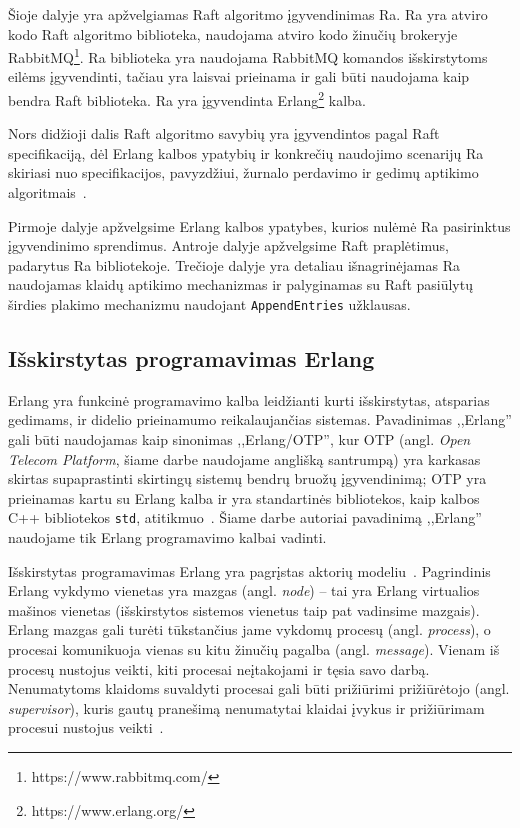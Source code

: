 \documentclass{VUMIFPSkursinis}
\begin{document}
Šioje dalyje yra apžvelgiamas Raft algoritmo įgyvendinimas Ra. Ra yra atviro kodo Raft algoritmo biblioteka, naudojama atviro kodo žinučių brokeryje RabbitMQ\footnote{https://www.rabbitmq.com/}. Ra biblioteka yra naudojama RabbitMQ komandos išskirstytoms eilėms įgyvendinti, tačiau yra laisvai prieinama ir gali būti naudojama kaip bendra Raft biblioteka. Ra yra įgyvendinta Erlang\footnote{https://www.erlang.org/} kalba.

Nors didžioji dalis Raft algoritmo savybių yra įgyvendintos pagal Raft specifikaciją, dėl Erlang kalbos ypatybių ir konkrečių naudojimo scenarijų Ra skiriasi nuo specifikacijos, pavyzdžiui, žurnalo perdavimo ir gedimų aptikimo algoritmais~\cite{rabbitmqra}.

Pirmoje dalyje apžvelgsime Erlang kalbos ypatybes, kurios nulėmė Ra pasirinktus įgyvendinimo sprendimus. Antroje dalyje apžvelgsime Raft praplėtimus, padarytus Ra bibliotekoje. Trečioje dalyje yra detaliau išnagrinėjamas Ra naudojamas klaidų aptikimo mechanizmas ir palyginamas su Raft pasiūlytų širdies plakimo mechanizmu naudojant \texttt{AppendEntries} užklausas.

\subsection{Išskirstytas programavimas Erlang}

Erlang yra funkcinė programavimo kalba leidžianti kurti išskirstytas, atsparias gedimams, ir didelio prieinamumo reikalaujančias sistemas. Pavadinimas ,,Erlang'' gali būti naudojamas kaip sinonimas ,,Erlang/OTP'', kur OTP (angl. \textit{Open Telecom Platform}, šiame darbe naudojame anglišką santrumpą) yra karkasas skirtas supaprastinti skirtingų sistemų bendrų bruožų įgyvendinimą; OTP yra prieinamas kartu su Erlang kalba ir yra standartinės bibliotekos, kaip kalbos C++ bibliotekos \texttt{std}, atitikmuo~\cite{erlang_introduction}. Šiame darbe autoriai pavadinimą ,,Erlang'' naudojame tik Erlang programavimo kalbai vadinti.

Išskirstytas programavimas Erlang yra pagrįstas aktorių modeliu~\cite{farrugia_towards_nodate, agha_actors_1985}. Pagrindinis Erlang vykdymo vienetas yra mazgas (angl. \textit{node}) -- tai yra Erlang virtualios mašinos vienetas (išskirstytos sistemos vienetus taip pat vadinsime mazgais). Erlang mazgas gali turėti tūkstančius jame vykdomų procesų (angl. \textit{process}), o procesai komunikuoja vienas su kitu žinučių pagalba (angl. \textit{message}). Vienam iš procesų nustojus veikti, kiti procesai neįtakojami ir tęsia savo darbą. Nenumatytoms klaidoms suvaldyti procesai gali būti prižiūrimi prižiūrėtojo (angl. \textit{supervisor}), kuris gautų pranešimą nenumatytai klaidai įvykus ir prižiūrimam procesui nustojus veikti~\cite{erlang_distributed}.
\end{document}
